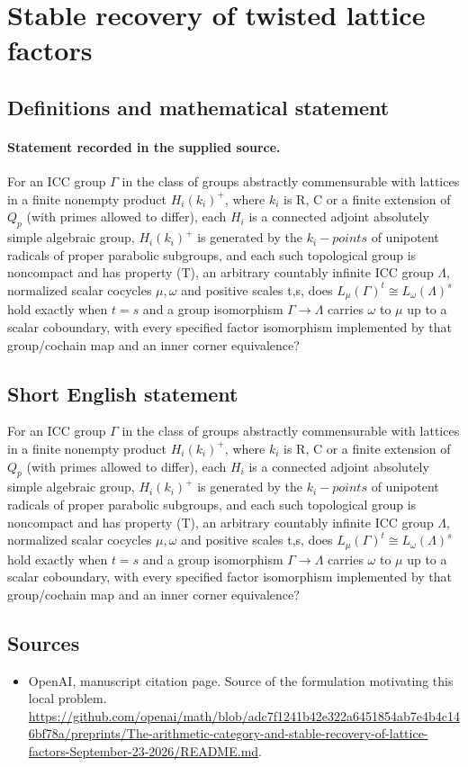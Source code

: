 \documentclass[11pt]{article}
\begin{document}
\section*{Stable recovery of twisted lattice factors}\label{statement}
\subsection{Definitions and mathematical statement}
\paragraph{Statement recorded in the supplied source.}
For an ICC group $\Gamma $ in the class of groups abstractly commensurable with lattices in a finite nonempty product $H_i(k_i)^+$, where $k_i$ is R, C or a finite extension of $Q_p$ (with primes allowed to differ), each $H_i$ is a connected adjoint absolutely simple algebraic group, $H_i(k_i)^+$ is generated by the $k_i-points$ of unipotent radicals of proper parabolic subgroups, and each such topological group is noncompact and has property (T), an arbitrary countably infinite ICC group $\Lambda $, normalized scalar cocycles $\mu ,\omega $ and positive scales t,s, does $L_\mu (\Gamma )^t\cong L_\omega (\Lambda )^s$ hold exactly when $t=s$ and a group isomorphism $\Gamma \to \Lambda $ carries $\omega $ to $\mu $ up to a scalar coboundary, with every specified factor isomorphism implemented by that group/cochain map and an inner corner equivalence?
\subsection{Short English statement}
For an ICC group $\Gamma $ in the class of groups abstractly commensurable with lattices in a finite nonempty product $H_i(k_i)^+$, where $k_i$ is R, C or a finite extension of $Q_p$ (with primes allowed to differ), each $H_i$ is a connected adjoint absolutely simple algebraic group, $H_i(k_i)^+$ is generated by the $k_i-points$ of unipotent radicals of proper parabolic subgroups, and each such topological group is noncompact and has property (T), an arbitrary countably infinite ICC group $\Lambda $, normalized scalar cocycles $\mu ,\omega $ and positive scales t,s, does $L_\mu (\Gamma )^t\cong L_\omega (\Lambda )^s$ hold exactly when $t=s$ and a group isomorphism $\Gamma \to \Lambda $ carries $\omega $ to $\mu $ up to a scalar coboundary, with every specified factor isomorphism implemented by that group/cochain map and an inner corner equivalence?
\subsection{Sources}
\begin{itemize}
\item[S1] OpenAI, manuscript citation page. Source of the formulation motivating this local problem.
\url{https://github.com/openai/math/blob/adc7f1241b42e322a6451854ab7e4b4c146bf78a/preprints/The-arithmetic-category-and-stable-recovery-of-lattice-factors-September-23-2026/README.md}.
\end{itemize}
\end{document}
